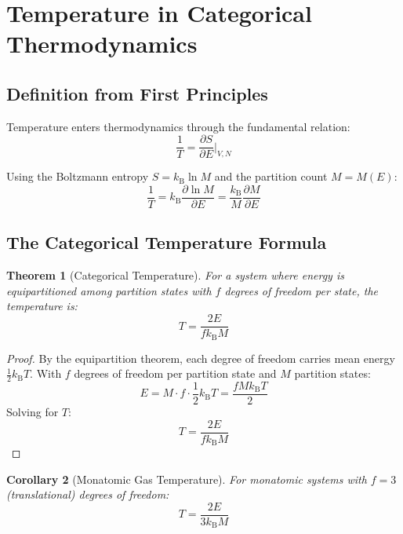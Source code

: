 \documentclass[twocolumn,10pt,twoside]{article}
\newtheorem{theorem}{Theorem}[section]
\newtheorem{corollary}[theorem]{Corollary}
\newcommand{\kb}{k_{\mathrm{B}}}
\begin{document}
\section{Temperature in Categorical Thermodynamics}

\subsection{Definition from First Principles}

Temperature enters thermodynamics through the fundamental relation:
\begin{equation}
\frac{1}{T} = \frac{\partial S}{\partial E}\bigg|_{V,N}
\label{eq:temp_fundamental}
\end{equation}

Using the Boltzmann entropy $S = \kb \ln M$ and the partition count $M = M(E)$:
\begin{equation}
\frac{1}{T} = \kb \frac{\partial \ln M}{\partial E} = \frac{\kb}{M} \frac{\partial M}{\partial E}
\label{eq:temp_derivative}
\end{equation}

\subsection{The Categorical Temperature Formula}

\begin{theorem}[Categorical Temperature]
\label{thm:categorical_temperature}
For a system where energy is equipartitioned among partition states with $f$ degrees of freedom per state, the temperature is:
\begin{equation}
T = \frac{2E}{f \kb M}
\label{eq:categorical_temperature}
\end{equation}
\end{theorem}

\begin{proof}
By the equipartition theorem, each degree of freedom carries mean energy $\frac{1}{2}\kb T$. With $f$ degrees of freedom per partition state and $M$ partition states:
\begin{equation}
E = M \cdot f \cdot \frac{1}{2} \kb T = \frac{f M \kb T}{2}
\end{equation}
Solving for $T$:
\begin{equation}
T = \frac{2E}{f \kb M}
\end{equation}
\end{proof}

\begin{corollary}[Monatomic Gas Temperature]
For monatomic systems with $f = 3$ (translational) degrees of freedom:
\begin{equation}
T = \frac{2E}{3\kb M}
\label{eq:monatomic_temperature}
\end{equation}
\end{corollary}
\end{document}
